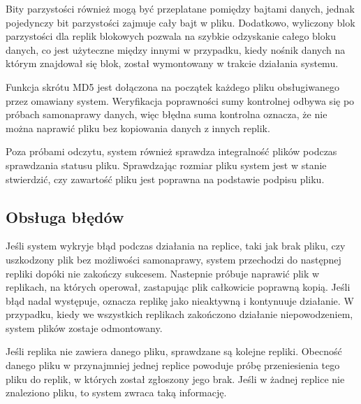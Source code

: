 Bity parzystości również mogą być przeplatane pomiędzy bajtami danych, jednak pojedynczy bit parzystości zajmuje cały bajt w pliku. Dodatkowo, wyliczony blok parzystości dla replik blokowych pozwala na szybkie odzyskanie całego bloku danych, co jest użyteczne między innymi w przypadku, kiedy nośnik danych na którym znajdował się blok, został wymontowany w trakcie działania systemu. 

Funkcja skrótu MD5 jest dołączona na początek każdego pliku obsługiwanego przez omawiany system. Weryfikacja poprawności sumy kontrolnej odbywa się po próbach samonaprawy danych, więc błędna suma kontrolna oznacza, że nie można naprawić pliku bez kopiowania danych z innych replik.

Poza próbami odczytu, system również sprawdza integralność plików podczas sprawdzania statusu pliku. Sprawdzając rozmiar pliku system jest w stanie stwierdzić, czy zawartość pliku jest poprawna na podstawie podpisu pliku. 

\subsection{Obsługa błędów}
Jeśli system wykryje błąd podczas działania na replice, taki jak brak pliku, czy uszkodzony plik bez możliwości samonaprawy, system przechodzi do następnej repliki dopóki nie zakończy sukcesem. Nastepnie próbuje naprawić plik w replikach, na których operował, zastapując plik całkowicie poprawną kopią. Jeśli błąd nadal występuje, oznacza replikę jako nieaktywną i kontynuuje działanie. W przypadku, kiedy we wszystkich replikach zakończono działanie niepowodzeniem, system plików zostaje odmontowany.

Jeśli replika nie zawiera danego pliku, sprawdzane są kolejne repliki. Obecność danego pliku w przynajmniej jednej replice powoduje próbę przeniesienia tego pliku do replik, w których został zgłoszony jego brak. Jeśli w żadnej replice nie znaleziono pliku, to system zwraca taką informację.
